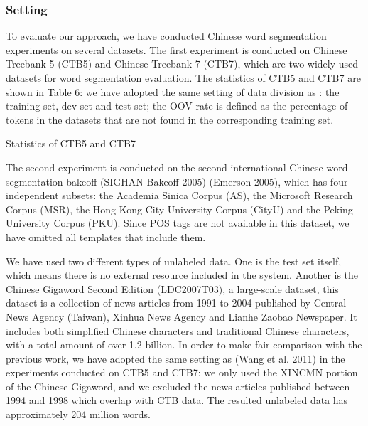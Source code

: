 \documentclass[english]{jnlp_1.4}
\begin{document}
\subsubsection{Setting}

To evaluate our approach, we have conducted Chinese word segmentation experiments on several datasets. The first experiment is conducted on Chinese Treebank 5 (CTB5) and Chinese Treebank 7 (CTB7), which are two widely used datasets for word segmentation evaluation. The statistics of CTB5 and CTB7 are shown in Table 6: we have adopted the same setting of data division as \cite{wang2011improving}: the training set, dev set and test set; the OOV rate is defined as the percentage of tokens in the datasets that are not found in the corresponding training set.

\begin{table}[b]
\caption{Statistics of CTB5 and CTB7}

\end{table}

The second experiment is conducted on the second international Chinese word segmentation bakeoff (SIGHAN Bakeoff-2005) (Emerson 2005), which has four independent subsets: the Academia Sinica Corpus (AS), the Microsoft Research Corpus (MSR), the Hong Kong City University Corpus (CityU) and the Peking University Corpus (PKU). Since POS tags are not available in this dataset, we have omitted all templates that include them. 

We have used two different types of unlabeled data. One is the test set itself, which means there is no external resource included in the system. Another is the Chinese Gigaword Second Edition (LDC2007T03), a large-scale dataset, this dataset is a collection of news articles from 1991 to 2004 published by Central News Agency (Taiwan), Xinhua News Agency and Lianhe Zaobao Newspaper. It includes both simplified Chinese characters and traditional Chinese characters, with a total amount of over 1.2 billion. In order to make fair comparison with the previous work, we have adopted the same setting as (Wang et al. 2011) in the experiments conducted on CTB5 and CTB7: we only used the XIN\textunderscore CMN portion of the Chinese Gigaword, and we excluded the news articles published between 1994 and 1998 which overlap with CTB data. The resulted unlabeled data has approximately 204 million words. 
\end{document}
